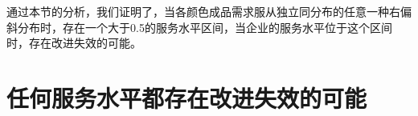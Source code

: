 通过本节的分析，我们证明了，当各颜色成品需求服从独立同分布的任意一种右偏斜分布时，存在一个大于0.5的服务水平区间，当企业的服务水平位于这个区间时，存在改进失效的可能。








\section{任何服务水平都存在改进失效的可能}






















